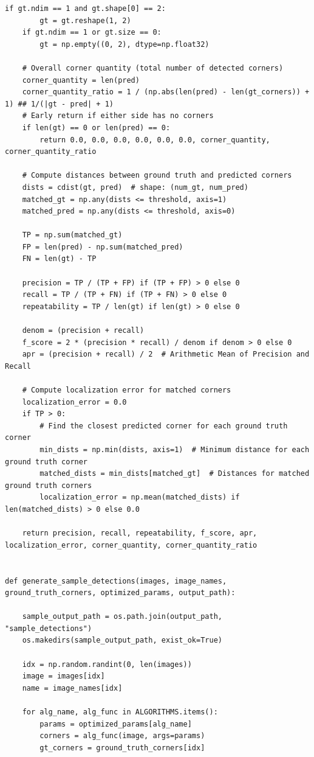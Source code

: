 \documentclass[journal]{IEEEtran}
\begin{document}
\begin{lstlisting}[style=python, caption={Utility Functions for Data Processing}, label={lst:utilities}]
    if gt.ndim == 1 and gt.shape[0] == 2:
        gt = gt.reshape(1, 2)
    if gt.ndim == 1 or gt.size == 0:
        gt = np.empty((0, 2), dtype=np.float32)

    # Overall corner quantity (total number of detected corners)
    corner_quantity = len(pred)
    corner_quantity_ratio = 1 / (np.abs(len(pred) - len(gt_corners)) + 1) ## 1/(|gt - pred| + 1)
    # Early return if either side has no corners
    if len(gt) == 0 or len(pred) == 0:
        return 0.0, 0.0, 0.0, 0.0, 0.0, 0.0, corner_quantity, corner_quantity_ratio

    # Compute distances between ground truth and predicted corners
    dists = cdist(gt, pred)  # shape: (num_gt, num_pred)
    matched_gt = np.any(dists <= threshold, axis=1)
    matched_pred = np.any(dists <= threshold, axis=0)

    TP = np.sum(matched_gt)
    FP = len(pred) - np.sum(matched_pred)
    FN = len(gt) - TP

    precision = TP / (TP + FP) if (TP + FP) > 0 else 0
    recall = TP / (TP + FN) if (TP + FN) > 0 else 0
    repeatability = TP / len(gt) if len(gt) > 0 else 0

    denom = (precision + recall)
    f_score = 2 * (precision * recall) / denom if denom > 0 else 0
    apr = (precision + recall) / 2  # Arithmetic Mean of Precision and Recall

    # Compute localization error for matched corners
    localization_error = 0.0
    if TP > 0:
        # Find the closest predicted corner for each ground truth corner
        min_dists = np.min(dists, axis=1)  # Minimum distance for each ground truth corner
        matched_dists = min_dists[matched_gt]  # Distances for matched ground truth corners
        localization_error = np.mean(matched_dists) if len(matched_dists) > 0 else 0.0

    return precision, recall, repeatability, f_score, apr, localization_error, corner_quantity, corner_quantity_ratio

        
def generate_sample_detections(images, image_names, ground_truth_corners, optimized_params, output_path):

    sample_output_path = os.path.join(output_path, "sample_detections")
    os.makedirs(sample_output_path, exist_ok=True)
    
    idx = np.random.randint(0, len(images))
    image = images[idx]
    name = image_names[idx]
    
    for alg_name, alg_func in ALGORITHMS.items():
        params = optimized_params[alg_name]
        corners = alg_func(image, args=params)
        gt_corners = ground_truth_corners[idx]
        

\end{lstlisting}
\end{document}
